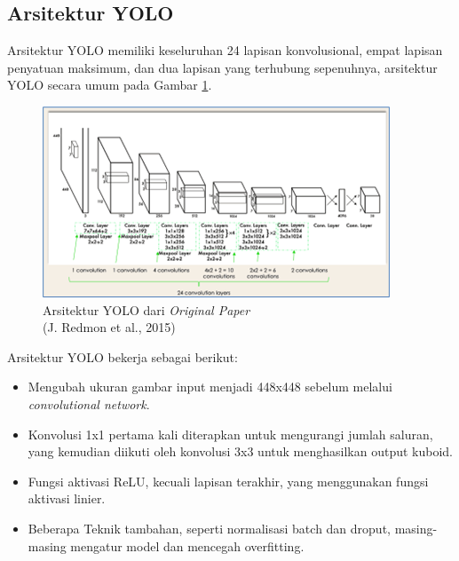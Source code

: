 \subsection{Arsitektur YOLO}
\hspace{1,2cm}Arsitektur YOLO memiliki keseluruhan 24 lapisan konvolusional, empat lapisan penyatuan maksimum, dan dua lapisan yang terhubung sepenuhnya, arsitektur YOLO secara umum pada Gambar \ref{img:Arsitektur-YOLO}.

\begin{figure}[H]
	\vspace{-0.1cm}
	\begin{center}
		\includegraphics[width=1\columnwidth]{bab2/Gambar/Picture30.png}
	\end{center}
	\vspace{-0.2cm}
	\captionsetup{justification=centering}
	\caption{Arsitektur YOLO dari \textit{Original Paper}\\(J. Redmon et al., 2015)}\label{img:Arsitektur-YOLO}
\end{figure}

Arsitektur YOLO bekerja sebagai berikut: 
\begin{itemize}
	\item Mengubah ukuran gambar input menjadi 448x448 sebelum melalui \textit{convolutional network}. 
	
	\item Konvolusi 1x1 pertama kali diterapkan untuk mengurangi jumlah saluran, yang kemudian diikuti oleh konvolusi 3x3 untuk menghasilkan output kuboid. 
	
	\item Fungsi aktivasi ReLU, kecuali lapisan terakhir, yang menggunakan fungsi aktivasi linier.
	
	\item Beberapa Teknik tambahan, seperti normalisasi batch dan droput, masing-masing mengatur model dan mencegah overfitting. 
\end{itemize}

